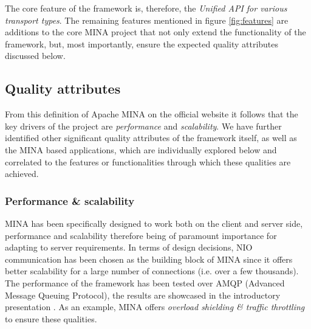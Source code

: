 The core feature of the framework is, therefore, the \textit{Unified API for various transport types}. The remaining features mentioned in figure \ref{fig:features} are additions to the core MINA project that not only extend the functionality of the framework, but, most importantly, ensure the expected quality attributes discussed below.

\subsection{Quality attributes}
\label{sec:quality_attributes}


From this definition of Apache MINA on the official website it follows that the key drivers of the project are \textit{performance} and \textit{scalability}. We have further identified other significant quality attributes of the framework itself, as well as the MINA based applications, which are individually explored below and correlated to the features or functionalities through which these qualities are achieved.

\subsubsection{Performance \& scalability}
MINA has been specifically designed to work both on the client and server side, performance and scalability therefore being of paramount importance for adapting to server requirements. In terms of design decisions, NIO communication has been chosen as the building block of MINA since it offers better scalability for a large number of connections (i.e. over a few thousands). The performance of the framework has been tested over AMQP (Advanced Message Queuing Protocol), the results are showcased in the introductory presentation \cite{mina-talk2006}. As an example, MINA offers \textit{overload shielding \& traffic throttling} to ensure these qualities.




